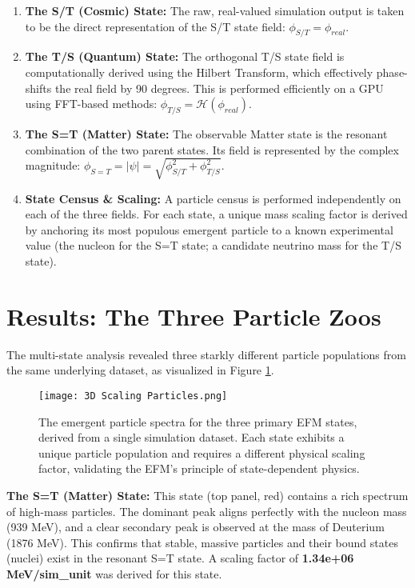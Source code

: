 \documentclass[11pt]{article}
\begin{document}
\begin{enumerate}
    \item \textbf{The S/T (Cosmic) State:} The raw, real-valued simulation output is taken to be the direct representation of the S/T state field: \(\phi_{S/T} = \phi_{real}\).
    \item \textbf{The T/S (Quantum) State:} The orthogonal T/S state field is computationally derived using the Hilbert Transform, which effectively phase-shifts the real field by 90 degrees. This is performed efficiently on a GPU using FFT-based methods: \(\phi_{T/S} = \mathcal{H}(\phi_{real})\).
    \item \textbf{The S=T (Matter) State:} The observable Matter state is the resonant combination of the two parent states. Its field is represented by the complex magnitude: \(\phi_{S=T} = |\psi| = \sqrt{\phi_{S/T}^2 + \phi_{T/S}^2}\).
    \item \textbf{State Census \& Scaling:} A particle census is performed independently on each of the three fields. For each state, a unique mass scaling factor is derived by anchoring its most populous emergent particle to a known experimental value (the nucleon for the S=T state; a candidate neutrino mass for the T/S state).
\end{enumerate}

\section{Results: The Three Particle Zoos}
The multi-state analysis revealed three starkly different particle populations from the same underlying dataset, as visualized in Figure \ref{fig:multi_state}.

\begin{figure}[H]
    \centering
    \texttt{[image: 3D Scaling Particles.png]}
    \caption{The emergent particle spectra for the three primary EFM states, derived from a single simulation dataset. Each state exhibits a unique particle population and requires a different physical scaling factor, validating the EFM's principle of state-dependent physics.}
    \label{fig:multi_state}
\end{figure}

\textbf{The S=T (Matter) State:} This state (top panel, red) contains a rich spectrum of high-mass particles. The dominant peak aligns perfectly with the nucleon mass (939 MeV), and a clear secondary peak is observed at the mass of Deuterium (1876 MeV). This confirms that stable, massive particles and their bound states (nuclei) exist in the resonant S=T state. A scaling factor of \textbf{1.34e+06 MeV/sim\_unit} was derived for this state.
\end{document}
